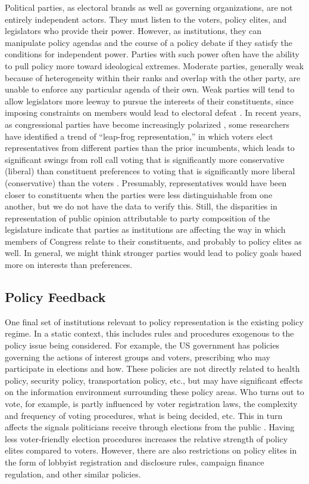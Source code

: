 Political parties, as electoral brands \citep{Mayhew1974} as well as governing organizations, are not entirely independent actors. They must listen to the voters, policy elites, and legislators who provide their power. However, as institutions, they can manipulate policy agendas and the course of a policy debate if they satisfy the conditions for independent power. Parties with such power often have the ability to pull policy more toward ideological extremes. Moderate parties, generally weak because of heterogeneity within their ranks and overlap with the other party, are unable to enforce any particular agenda of their own. Weak parties will tend to allow legislators more leeway to pursue the interests of their constituents, since imposing constraints on members would lead to electoral defeat \citep{CanesWrone2002}. In recent years, as congressional parties have become increasingly polarized \citep{Poole1984}, some researchers have identified a trend of ``leap-frog representation,'' in which voters elect representatives from different parties than the prior incumbents, which leads to significant swings from roll call voting that is significantly more conservative (liberal) than constituent preferences to voting that is significantly more liberal (conservative) than the voters \citep{Bafumi2010}. Presumably, representatives would have been closer to constituents when the parties were less distinguishable from one another, but we do not have the data to verify this. Still, the disparities in representation of public opinion attributable to party composition of the legislature indicate that parties as institutions are affecting the way in which members of Congress relate to their constituents, and probably to policy elites as well. In general, we might think stronger parties would lead to policy goals based more on interests than preferences.

\subsection*{Policy Feedback}
One final set of institutions relevant to policy representation is the existing policy regime. In a static context, this includes rules and procedures exogenous to the policy issue being considered. For example, the US government has policies governing the actions of interest groups and voters, prescribing who may participate in elections and how. These policies are not directly related to health policy, security policy, transportation policy, etc., but may have significant effects on the information environment surrounding these policy areas. Who turns out to vote, for example, is partly influenced by voter registration laws, the complexity and frequency of voting procedures, what is being decided, etc. This in turn affects the signals politicians receive through elections from the public \citep{Dalton1993}. Having less voter-friendly election procedures increases the relative strength of policy elites compared to voters. However, there are also restrictions on policy elites in the form of lobbyist registration and disclosure rules, campaign finance regulation, and other similar policies.

